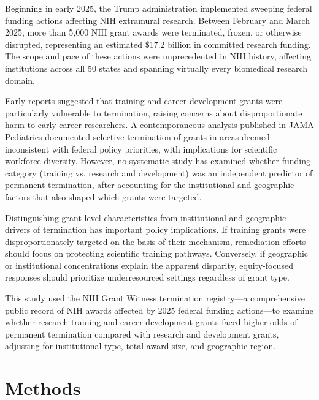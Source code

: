 \documentclass[10pt, letterpaper]{article}
\begin{document}
Beginning in early 2025, the Trump administration implemented sweeping federal funding actions affecting NIH extramural research. Between February and March 2025, more than 5,000 NIH grant awards were terminated, frozen, or otherwise disrupted, representing an estimated \$17.2 billion in committed research funding.\cite{GrantWitness2025} The scope and pace of these actions were unprecedented in NIH history, affecting institutions across all 50 states and spanning virtually every biomedical research domain.\cite{Jalali2025}

Early reports suggested that training and career development grants were particularly vulnerable to termination, raising concerns about disproportionate harm to early-career researchers.\cite{Mastej2025} A contemporaneous analysis published in JAMA Pediatrics documented selective termination of grants in areas deemed inconsistent with federal policy priorities, with implications for scientific workforce diversity.\cite{Miller2026} However, no systematic study has examined whether funding category (training vs. research and development) was an independent predictor of permanent termination, after accounting for the institutional and geographic factors that also shaped which grants were targeted.

Distinguishing grant-level characteristics from institutional and geographic drivers of termination has important policy implications. If training grants were disproportionately targeted on the basis of their mechanism, remediation efforts should focus on protecting scientific training pathways. Conversely, if geographic or institutional concentrations explain the apparent disparity, equity-focused responses should prioritize underresourced settings regardless of grant type.

This study used the NIH Grant Witness termination registry---a comprehensive public record of NIH awards affected by 2025 federal funding actions---to examine whether research training and career development grants faced higher odds of permanent termination compared with research and development grants, adjusting for institutional type, total award size, and geographic region.

\section*{Methods}
\end{document}
